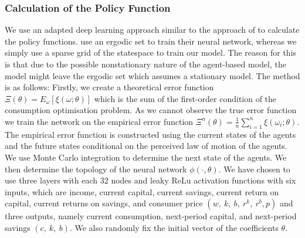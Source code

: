 \subsubsection{Calculation of the Policy Function}
We use an adapted deep learning approach similar to the approach of \cite{maliar_deep_2021} to calculate the policy functions. \cite{maliar_deep_2021} use an ergodic set to train their neural network, whereas we simply use a sparse grid of the statespace to train our model. The reason for this is that due to the possible nonstationary nature of the agent-based model, the model might leave the ergodic set which assumes a stationary model. The method is as follows: Firstly, we create a theoretical error function $\Xi(\theta)=E_\omega[\xi(\omega ; \theta)]$ which is the sum of the first-order condition of the consumption optimisation problem. As we cannot observe the true error function we train the network on the empirical error function $\Xi^n(\theta)=\frac{1}{n} \sum_{i=1}^n \xi\left(\omega_i ; \theta\right)$. The empirical error function is constructed using the current states of the agents and the future states conditional on the perceived law of motion of the agents. We use Monte Carlo integration to determine the next state of the agents. We then determine the topology of the neural network $\phi(\cdot,\theta)$. We have chosen to use three layers with each 32 nodes and leaky ReLu activation functions with six inputs, which are income, current capital, current savings, current return on capital, current returns on savings, and consumer price $(w, \ k, \ b, \ r^k, \ r^b, p) $ and three outputs, namely current consumption, next-period capital, and next-period savings $(c, \ k, \ b)$. We also randomly fix the initial vector of the coefficients $\theta$. \\

